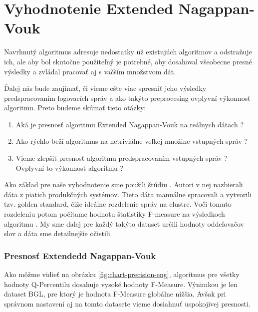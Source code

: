 \chapter{Vyhodnotenie Extended Nagappan-Vouk}
Navrhnutý algoritmus adresuje nedostatky už existujúch algoritmov a odstraňuje ich, ale aby bol skutočne použiteľný je potrebné, aby dosahoval  všeobecne presné výsledky a zvládal pracovať aj s vačším množstvom dát. 

\par Ďalej nás bude zaujímať, či vieme ešte viac spresniť jeho výsledky predspracovaním logovacích správ a ako takýto preprocesing ovplyvní výkonnosť algoritmu. Preto budeme skúmať tieto otázky:

\begin{enumerate}
  \item Aká je presnosť algoritmu Extended Nagappan-Vouk na reálnych dátach ?
  \item Ako rýchlo beží algoritmus na netriviálne veľkej množine vstupných správ ?
  \item Vieme zlepšiť presnosť algoritmu predspracovaním vstupných správ ? Ovplyvní to výkonnosť algoritmu ?
\end{enumerate}

Ako základ pre naše vyhodnotenie sme použili štúdiu \parencite{he2016}. Autori v nej nazbierali dáta z piatich produkčných systémov. Tieto dáta manuálne spracovali a vytvorili tzv. golden standard, čiže ideálne rozdelenie správ na clustre. Voči tomuto rozdeleniu potom počítame hodnotu štatistiky F-measure na výsledkoch algoritmu \parencite{goldenstandard}. My sme ďalej pre každý takýto dataset určili hodnoty oddeľovačov slov a dáta sme detailnejšie očistili.

\subsection{Presnosť Extendedd Nagappan-Vouk}
Ako môžme vidieť na obrázku \ref{fig:chart-precision-eng}, algoritmus pre všetky hodnoty Q-Percentilu dosahuje vysoké hodnoty F-Measure. Výnimkou je len dataset BGL, pre ktorý je hodnota F-Measure globálne nížšia. Avšak pri správnom nastavení aj na tomto datasete vieme dosiahnuť uspokojivej presnosti.

